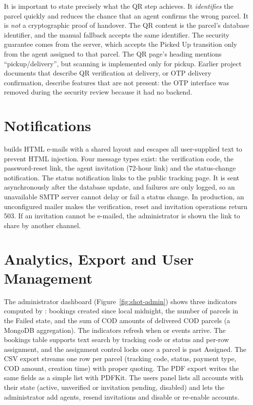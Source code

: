 It is important to state precisely what the QR step achieves. It \emph{identifies} the parcel quickly and reduces the chance that an agent confirms the wrong parcel. It is \emph{not} a cryptographic proof of handover. The QR content is the parcel's database identifier, and the manual fallback accepts the same identifier. The security guarantee comes from the server, which accepts the Picked Up transition only from the agent assigned to that parcel. The QR page's heading mentions ``pickup/delivery'', but scanning is implemented only for pickup. Earlier project documents that describe QR verification at delivery, or OTP delivery confirmation, describe features that are not present: the OTP interface was removed during the security review because it had no backend.

\section{Notifications}
\label{sec:impl-notify}

 builds HTML e-mails with a shared layout and escapes all user-supplied text to prevent HTML injection. Four message types exist: the verification code, the password-reset link, the agent invitation (72-hour link) and the status-change notification. The status notification links to the public tracking page. It is sent asynchronously after the database update, and failures are only logged, so an unavailable SMTP server cannot delay or fail a status change. In production, an unconfigured mailer makes the verification, reset and invitation operations return 503. If an invitation cannot be e-mailed, the administrator is shown the link to share by another channel.

\section{Analytics, Export and User Management}
\label{sec:impl-analytics}

The administrator dashboard (Figure~\ref{fig:shot-admin}) shows three indicators computed by : bookings created since local midnight, the number of parcels in the Failed state, and the sum of COD amounts of delivered COD parcels (a MongoDB aggregation). The indicators refresh when  or  events arrive. The bookings table supports text search by tracking code or status and per-row assignment, and the assignment control locks once a parcel is past Assigned. The CSV export streams one row per parcel (tracking code, status, payment type, COD amount, creation time) with proper quoting. The PDF export writes the same fields as a simple list with PDFKit. The users panel lists all accounts with their state (active, unverified or invitation pending, disabled) and lets the administrator add agents, resend invitations and disable or re-enable accounts.


